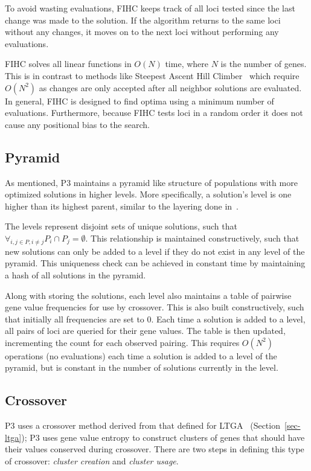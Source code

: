 \documentclass{sig-alternate}
\begin{document}
To avoid wasting evaluations, FIHC keeps track of all loci tested since the last
change was made to the solution.  If the algorithm returns to the same loci without
any changes, it moves on to the next loci without performing any evaluations.

FIHC solves all linear functions in $O(N)$ time, where $N$ is the number of
genes.  This is in contrast to
methods like Steepest Ascent Hill Climber~\cite{bosman:2011:lsbbo, goldman:2012:ltga}
which require $O(N^2)$ as changes are only accepted after all neighbor solutions
are evaluated.  In general, FIHC is designed to find optima using a minimum number
of evaluations.  Furthermore, because FIHC tests loci in a random order it does
not cause any positional bias to the search.


\subsection{Pyramid}
\label{sec-pyramid}
As mentioned, P3 maintains a pyramid like structure of populations
with more optimized solutions in higher levels. More specifically, a solution's level is one higher than
its highest parent, similar to the layering done
in~\cite{hornby:2006:alps}.

The levels represent disjoint sets of unique solutions, such that
$\forall_{i, j \in P, i \neq j} P_i \cap P_j = \emptyset$.  This relationship
is maintained constructively, such that new solutions can only be added to a level
if they do not exist in any level of the pyramid.  This uniqueness check can be
achieved in constant time by maintaining a hash of all solutions in the pyramid.

Along with storing the solutions, each level also maintains a table of pairwise
gene value frequencies for use by crossover.  This is also built constructively, such that initially
all frequencies are set to 0.  Each time a solution is added to a level, all
pairs of loci are queried for their gene values.  The table is then updated,
incrementing the count for each observed pairing.  This requires $O(N^2)$ operations
(no evaluations) each time a solution is added to a level of the pyramid, but is
constant in the number of solutions currently in the level.

\subsection{Crossover}
\label{sec-crossover}
P3 uses a crossover method derived from that defined for LTGA~\cite{thierens:2013:ltgahiff}
(Section~\ref{sec-ltga});
P3 uses gene value entropy to construct clusters of genes that should have their values
conserved during crossover.  There are two steps in
defining this type of crossover: \emph{cluster creation} and \emph{cluster usage}.
\end{document}
